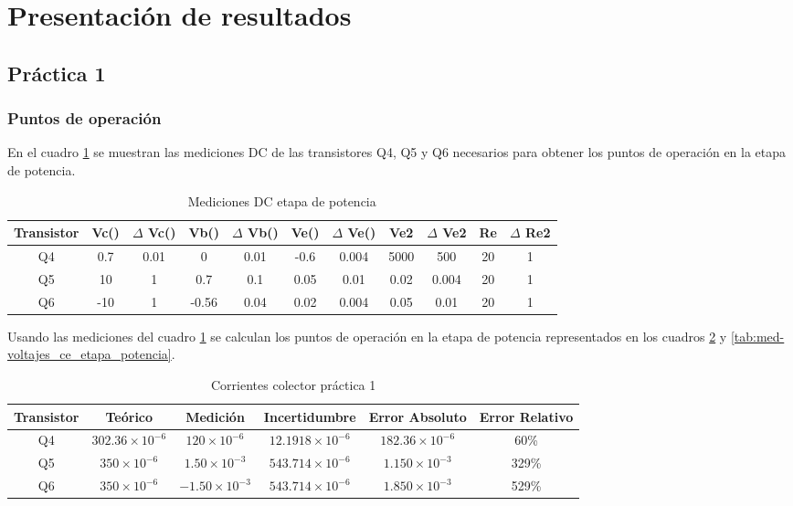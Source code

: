 \section{Presentación de resultados}

\subsection{Práctica 1}

\subsubsection{Puntos de operación}

En el cuadro \ref{tab:med-puntos-dc-etapa-potencia} se muestran las mediciones DC de las transistores Q4, Q5 y Q6 necesarios para obtener los puntos de operación en la etapa de potencia. 

\begin{table}[ht]
\centering
\begin{tabular}{|c|c|c|c|c|c|c|c|c|c|c|}
\hline
\textbf{Transistor} & \textbf{Vc()} & \textbf{$\varDelta$ Vc()} & \textbf{Vb()} & \textbf{$\varDelta$ Vb()} & \textbf{Ve()} & \textbf{$\varDelta$ Ve()} & \textbf{Ve2} & \textbf{$\varDelta$ Ve2} & \textbf{Re} & \textbf{$\varDelta$ Re2} \\ \hline
Q4 & 0.7 & 0.01 & 0 & 0.01 & -0.6 & 0.004 & 5000 & 500 & 20 & 1 \\
\hline
Q5 & 10 & 1 & 0.7 & 0.1 & 0.05 & 0.01 & 0.02 & 0.004 & 20 & 1 \\ \hline
Q6 & -10 & 1 & -0.56 & 0.04 & 0.02 & 0.004 & 0.05 & 0.01 & 20 & 1 \\ \hline
\end{tabular}
\caption{Mediciones DC etapa de potencia}
\label{tab:med-puntos-dc-etapa-potencia}
\end{table}

Usando las mediciones del cuadro \ref{tab:med-puntos-dc-etapa-potencia} se calculan los puntos de operación en la etapa de potencia representados en los cuadros \ref{tab:ic-practica-1} y \ref{tab:med-voltajes_ce_etapa_potencia}.

\begin{table}[ht]
\centering
\begin{tabular}{|c|c|c|c|c|c|}
\hline
Transistor & Teórico & Medición & Incertidumbre & Error Absoluto & Error Relativo \\\hline
Q4 & $302.36 \times 10^{-6}$ & $120 \times 10^{-6}$ & $12.1918 \times 10^{-6}$ & $182.36 \times 10^{-6}$ & 60\% \\\hline
Q5 & $350 \times 10^{-6}$ & $1.50 \times 10^{-3}$ & $543.714 \times 10^{-6}$ & $1.150 \times 10^{-3}$ & 329\% \\\hline
Q6 & $350 \times 10^{-6}$ & $-1.50 \times 10^{-3}$ & $543.714 \times 10^{-6}$ & $1.850 \times 10^{-3}$ & 529\% \\\hline
\end{tabular}
\caption{Corrientes colector práctica 1}
\label{tab:ic-practica-1}
\end{table}

